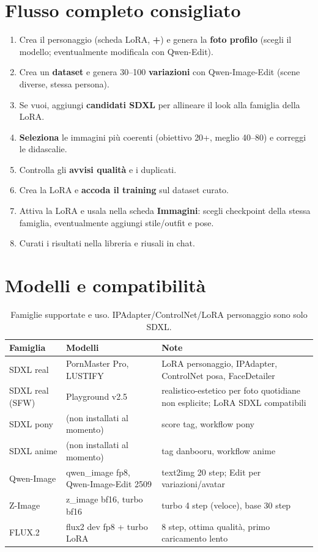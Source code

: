 \documentclass[11pt,a4paper]{article}
\begin{document}
\section{Flusso completo consigliato}
\begin{enumerate}
  \item Crea il personaggio (scheda LoRA, \textbf{+}) e genera la \textbf{foto profilo} (scegli il modello; eventualmente modificala con Qwen-Edit).
  \item Crea un \textbf{dataset} e genera 30--100 \textbf{variazioni} con Qwen-Image-Edit (scene diverse, stessa persona).
  \item Se vuoi, aggiungi \textbf{candidati SDXL} per allineare il look alla famiglia della LoRA.
  \item \textbf{Seleziona} le immagini pi\`u coerenti (obiettivo 20+, meglio 40--80) e correggi le didascalie.
  \item Controlla gli \textbf{avvisi qualit\`a} e i duplicati.
  \item Crea la LoRA e \textbf{accoda il training} sul dataset curato.
  \item Attiva la LoRA e usala nella scheda \textbf{Immagini}: scegli checkpoint della stessa famiglia, eventualmente aggiungi stile/outfit e pose.
  \item Curati i risultati nella libreria e riusali in chat.
\end{enumerate}

\section{Modelli e compatibilit\`a}
\begin{table}[h]
\centering
\begin{tabularx}{\textwidth}{l l X}
\toprule
\textbf{Famiglia} & \textbf{Modelli} & \textbf{Note} \\
\midrule
SDXL real & PornMaster Pro, LUSTIFY & LoRA personaggio, IPAdapter, ControlNet posa, FaceDetailer \\
SDXL real (SFW) & Playground v2.5 & realistico-estetico per foto quotidiane non esplicite; LoRA SDXL compatibili \\
SDXL pony & (non installati al momento) & score tag, workflow pony \\
SDXL anime & (non installati al momento) & tag danbooru, workflow anime \\
Qwen-Image & qwen\_image fp8, Qwen-Image-Edit 2509 & text2img 20 step; Edit per variazioni/avatar \\
Z-Image & z\_image bf16, turbo bf16 & turbo 4 step (veloce), base 30 step \\
FLUX.2 & flux2 dev fp8 + turbo LoRA & 8 step, ottima qualit\`a, primo caricamento lento \\
\bottomrule
\end{tabularx}
\caption{Famiglie supportate e uso. IPAdapter/ControlNet/LoRA personaggio sono solo SDXL.}
\end{table}
\end{document}
